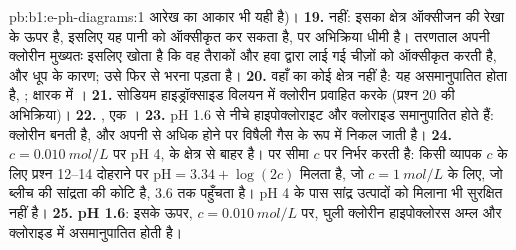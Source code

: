 \begin{solution}{pb:b1:e-ph-diagrams:1}
आरेख का आकार भी यही है)।
\textbf{19.} नहीं: इसका क्षेत्र ऑक्सीजन की रेखा के ऊपर है, इसलिए यह
पानी को ऑक्सीकृत कर सकता है, पर अभिक्रिया धीमी है। तरणताल अपनी क्लोरीन मुख्यतः
इसलिए खोता है कि वह तैराकों और हवा द्वारा लाई गई चीज़ों को ऑक्सीकृत करती है, और
धूप के कारण; उसे फिर से भरना पड़ता है।
\textbf{20.} वहाँ  का कोई क्षेत्र नहीं है: यह असमानुपातित होता है,
; क्षारक में
।
\textbf{21.} सोडियम हाइड्रॉक्साइड विलयन में क्लोरीन प्रवाहित करके (प्रश्न 20 की
अभिक्रिया)।
\textbf{22.} , एक ।
\textbf{23.} pH 1.6 से नीचे हाइपोक्लोराइट और क्लोराइड समानुपातित होते हैं: क्लोरीन बनती है,
और अपनी  से अधिक होने पर विषैली गैस के रूप में निकल जाती है।
\textbf{24.} $c = \qty{0.010}{mol/L}$ पर pH 4,
 के क्षेत्र से बाहर है। पर सीमा $c$ पर निर्भर करती है: किसी व्यापक $c$ के लिए
प्रश्न 12--14 दोहराने पर $\mathrm{pH} = 3.34 + \log(2c)$ मिलता है, जो
$c = \qty{1}{mol/L}$ के लिए, जो ब्लीच की सांद्रता की कोटि है, 3.6 तक पहुँचता है।
pH 4 के पास सांद्र उत्पादों को मिलाना भी सुरक्षित नहीं है।
\textbf{25.} \textbf{pH 1.6}: इसके ऊपर, $c = \qty{0.010}{mol/L}$ पर,
घुली क्लोरीन हाइपोक्लोरस अम्ल और क्लोराइड में असमानुपातित होती है।
\end{solution}
